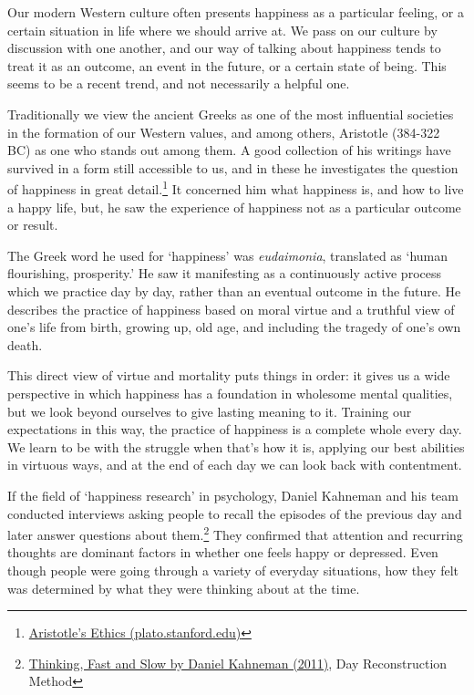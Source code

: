
Our modern Western culture often presents happiness as a particular
feeling, or a certain situation in life where we should arrive at. We
pass on our culture by discussion with one another, and our way of
talking about happiness tends to treat it as an outcome, an event in the
future, or a certain state of being. This seems to be a recent trend,
and not necessarily a helpful one.

Traditionally we view the ancient Greeks as one of the most influential
societies in the formation of our Western values, and among others,
Aristotle (384-322 BC) as one who stands out among them. A good
collection of his writings have survived in a form still accessible to
us, and in these he investigates the question of happiness in great
detail.\footnote{\href{https://plato.stanford.edu/entries/aristotle-ethics/}{Aristotle's
  Ethics (plato.stanford.edu)}} It concerned him what happiness is, and
how to live a happy life, but, he saw the experience of happiness not as
a particular outcome or result.

The Greek word he used for `happiness' was \emph{eudaimonia}, translated
as `human flourishing, prosperity.' He saw it manifesting as a
continuously active process which we practice day by day, rather than an
eventual outcome in the future. He describes the practice of happiness
based on moral virtue and a truthful view of one's life from birth,
growing up, old age, and including the tragedy of one's own death.

This direct view of virtue and mortality puts things in order: it gives
us a wide perspective in which happiness has a foundation in wholesome
mental qualities, but we look beyond ourselves to give lasting meaning
to it. Training our expectations in this way, the practice of happiness
is a complete whole every day. We learn to be with the struggle when
that's how it is, applying our best abilities in virtuous ways, and at
the end of each day we can look back with contentment.

If the field of `happiness research' in psychology, Daniel Kahneman and
his team conducted interviews asking people to recall the episodes of
the previous day and later answer questions about them.\footnote{\href{https://www.goodreads.com/book/show/11468377-thinking-fast-and-slow}{Thinking,
  Fast and Slow by Daniel Kahneman (2011)}, Day Reconstruction Method}
They confirmed that attention and recurring thoughts are dominant
factors in whether one feels happy or depressed. Even though people were
going through a variety of everyday situations, how they felt was
determined by what they were thinking about at the time.

